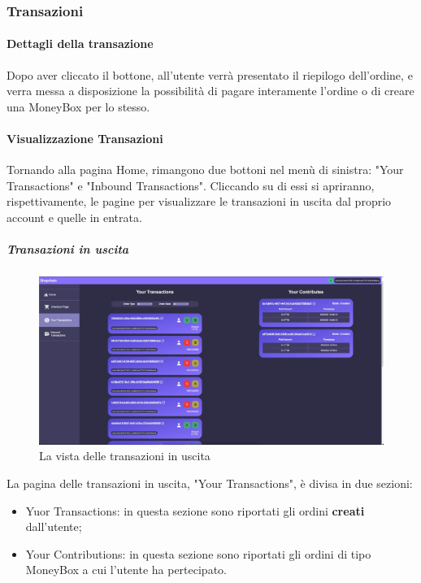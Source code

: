         \subsubsection{Transazioni}


            \paragraph{Dettagli della transazione}

            Dopo aver cliccato il bottone, all'utente verrà presentato il riepilogo dell'ordine, e verra messa a disposizione la possibilità
            di pagare interamente l'ordine o di creare una MoneyBox per lo stesso.


            \paragraph{Visualizzazione Transazioni}

            Tornando alla pagina Home, rimangono due bottoni nel menù di sinistra: "Your Transactions" e "Inbound Transactions".
            Cliccando su di essi si apriranno, rispettivamente, le pagine per visualizzare le transazioni in uscita dal proprio account e quelle in entrata.


                \subparagraph{Transazioni in uscita}

                \begin{figure}[H]
                    \centering
                    \includegraphics[scale=0.4]{immagini/Transaction/transactionview.jpg}
                    \caption{La vista delle transazioni in uscita}
                \end{figure}

                La pagina delle transazioni in uscita, "Your Transactions", è divisa in due sezioni:
                \begin{itemize}
                    \item Yuor Transactions: in questa sezione sono riportati gli ordini \textbf{creati} dall'utente;
                    \item Your Contributions: in questa sezione sono riportati gli ordini di tipo MoneyBox a cui l'utente ha pertecipato.
                \end{itemize}

